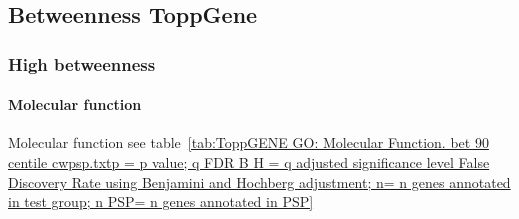 \subsection{Betweenness ToppGene}
\subsubsection{High betweenness}
\paragraph{Molecular function}
Molecular function see table~\ref{tab:ToppGENE GO: Molecular Function. bet 90 centile cwpsp.txtp = p value; q FDR B H = q adjusted significance level False Discovery Rate using Benjamini and Hochberg adjustment; n= n genes annotated in test group; n PSP= n genes annotated in PSP}


